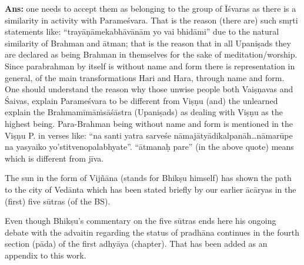 \textbf{Ans:} one needs to accept them as belonging to the group of Īśvaras as there is a similarity in activity with Parameśvara. That is the reason (there are) such smṛti statements like: “trayāṇāmekabhāvānām yo vai bhidāmi” due to the natural similarity of Brahman and ātman; that is the reason that in all Upaniṣads they are declared as being Brahman in themselves for the sake of meditation/worship. Since parabrahman by itself is without name and form there is representation in general, of the main transformations Hari and Hara, through name and form. One should understand the reason why those unwise people both  Vaiṣṇavas and Śaivas, explain Parameśvara to be different from Viṣṇu (and) the unlearned explain the Brahmamīmāṁsāśāstra (Upaniṣads) as dealing with Viṣṇu as the highest being. Para-Brahman being without name and form is mentioned in the Viṣṇu P. in verses like: “na santi yatra sarveśe nāmajātyādikalpanāh…nāmarūpe na yasyaiko yo’stitvenopalabhyate”. “ātmanaḥ pare” (in the above quote) means which is different from jīva.

The sun in the form of Vijñāna (stands for Bhikṣu himself) has shown the path to the city of Vedānta which has been stated briefly by our earlier ācāryas in the (first) five sūtras (of the BS).

Even though Bhikṣu’s commentary on the five sūtras ends here his ongoing debate with the advaitin regarding the status of pradhāna continues in the fourth section (pāda) of the first adhyāya (chapter).  That has been added as an appendix to this work.
